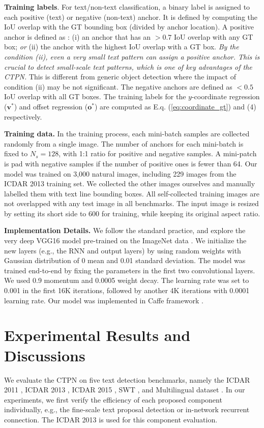 \documentclass[runningheads]{llncs}
\begin{document}
\textbf{Training labels}.  For text/non-text classification,  a binary label is assigned to each positive (text) or negative (non-text) anchor. It is defined by computing the IoU overlap with the GT bounding box (divided by anchor location). A positive anchor is defined as : (i) an anchor that has an $>0.7$ IoU overlap with any GT box; \textit{or} (ii) the anchor with the highest IoU overlap with a GT box. \textit{By the condition (ii), even a very small text pattern can assign a positive anchor. This is crucial to detect small-scale text patterns, which is one of key advantages of the CTPN. } This is different from generic object detection where the impact of condition (ii) may be not significant. The negative anchors are defined as $<0.5$ IoU overlap with all GT boxes. The training labels for the $y$-coordinate regression ($\textbf{v}^*$) and offset regression  ($\textbf{o}^*$) are computed as E.q. (\ref{eq:coordinate_gt}) and (4) respectively.

\textbf{Training data.} In the training process, each mini-batch samples are collected randomly from a single image. The number of anchors for each mini-batch is fixed to  $N_s=128$, with 1:1 ratio for positive and negative samples. A mini-patch is pad with negative samples if the number of positive ones is fewer than 64. Our model was trained on 3,000 natural images, including 229 images from the ICDAR 2013 training set. We collected the other images ourselves and manually labelled them with text line bounding boxes. All self-collected training images are not overlapped with any test image in all benchmarks.  The input image is resized by setting its short side to 600 for training, while keeping its original aspect ratio.

\textbf{Implementation Details.} We follow the standard practice,  and explore the  very deep VGG16 model \cite{Simonyan2015} pre-trained on the ImageNet data \cite{Russakovsky2015}. We initialize the new layers (e.g., the RNN and output layers) by using random weights with Gaussian distribution of 0 mean and 0.01 standard deviation.  The model was trained end-to-end by fixing the parameters in the first two convolutional layers. We used 0.9 momentum and 0.0005 weight decay. The learning rate was set to 0.001 in the first 16K iterations, followed by another 4K iterations with 0.0001 learning rate. Our model was implemented in Caffe framework \cite{Jia2014}.


\section{Experimental Results and Discussions}
We evaluate the  CTPN on five text detection benchmarks, namely the ICDAR 2011 \cite{Minetto2010}, ICDAR 2013 \cite{Karatzas2013}, ICDAR 2015 \cite{Karatzas2015}, SWT \cite{Epshtein2010}, and Multilingual dataset \cite{Pan2011}. In our experiments, we first verify the efficiency of each proposed component individually, e.g., the fine-scale text proposal detection or  in-network recurrent connection. The ICDAR 2013 is used for this component evaluation.
\end{document}
